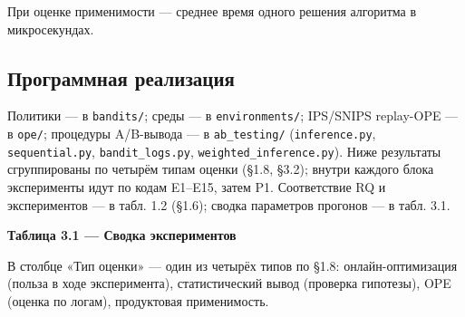 При оценке применимости --- среднее время одного решения алгоритма в микросекундах.

\subsection{Программная реализация}\label{ux43fux440ux43eux433ux440ux430ux43cux43cux43dux430ux44f-ux440ux435ux430ux43bux438ux437ux430ux446ux438ux44f}

Политики --- в \texttt{bandits/}; среды --- в \texttt{environments/}; IPS/SNIPS replay-OPE --- в \texttt{ope/}; процедуры A/B-вывода --- в \texttt{ab\_testing/} (\texttt{inference.py}, \texttt{sequential.py}, \texttt{bandit\_logs.py}, \texttt{weighted\_inference.py}). Ниже результаты сгруппированы по четырём типам оценки (§1.8, §3.2); внутри каждого блока эксперименты идут по кодам E1--E15, затем P1. Соответствие RQ и экспериментов --- в табл. 1.2 (§1.6); сводка параметров прогонов --- в табл. 3.1.

\textbf{Таблица 3.1 --- Сводка экспериментов}

В столбце «Тип оценки» --- один из четырёх типов по §1.8: онлайн-оптимизация (польза в ходе эксперимента), статистический вывод (проверка гипотезы), OPE (оценка по логам), продуктовая применимость.

